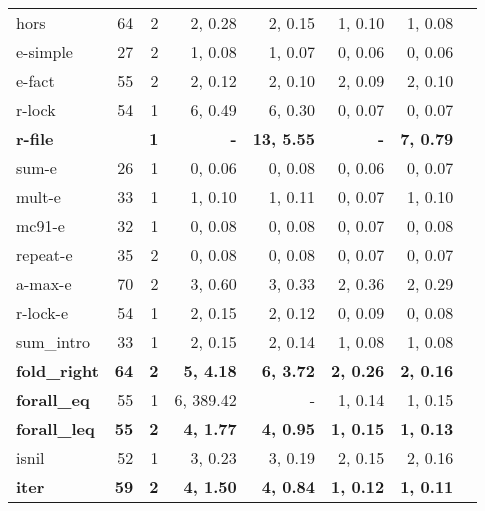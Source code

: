 \begin{table}
\begin{center}
\begin{tabular}{|l|r|r|r|r|r|r|r|}
\!hors       &    64&      2& 2, 0.28 & 2, 0.15 & 1, 0.10 & 1, 0.08 \\
\!e-simple   &    27&      2& 1, 0.08 & 1, 0.07 & 0, 0.06 & 0, 0.06 \\
\!e-fact     &    55&      2& 2, 0.12 & 2, 0.10 & 2, 0.09 & 2, 0.10 \\
\!r-lock     &    54&      1& 6, 0.49 & 6, 0.30 & 0, 0.07 & 0, 0.07 \\
\!\bf  r-file     &\bf    \!168&\bf       1&\bf  - &\bf  13, 5.55 &\bf  - &\bf  7, 0.79 \\
\!sum-e      &    26&      1& 0, 0.06 & 0, 0.08 & 0, 0.06 & 0, 0.07 \\
\!mult-e     &    33&      1& 1, 0.10 & 1, 0.11 & 0, 0.07 & 1, 0.10 \\
\!mc91-e     &    32&      1& 0, 0.08 & 0, 0.08 & 0, 0.07 & 0, 0.08 \\
\!repeat-e   &    35&      2& 0, 0.08 & 0, 0.08 & 0, 0.07 & 0, 0.07 \\
\!a-max-e    &    70&      2& 3, 0.60 & 3, 0.33 & 2, 0.36 & 2, 0.29 \\
\!r-lock-e   &    54&      1& 2, 0.15 & 2, 0.12 & 0, 0.09 & 0, 0.08 \\
\hline
\!sum\_intro        &  33 & 1 & 2, 0.15 & 2, 0.14 & 1, 0.08 & 1, 0.08 \\
\!\bf  fold\_right       &\bf   64 &\bf  2 &\bf  5, 4.18 &\bf  6, 3.72 &\bf  2, 0.26 &\bf  2, 0.16 \\
\!\bf forall\_eq  &  55 & 1 & 6, 389.42 & - & 1, 0.14 & 1, 0.15 \\
\!\bf  forall\_leq       &\bf   55 &\bf  2 &\bf  4, 1.77 &\bf  4, 0.95 &\bf  1, 0.15 &\bf  1, 0.13 \\
\!isnil             &  52 & 1 & 3, 0.23 & 3, 0.19 & 2, 0.15 & 2, 0.16 \\
\!\bf  iter              &\bf   59 &\bf  2 &\bf  4, 1.50 &\bf  4, 0.84 &\bf  1, 0.12 &\bf  1, 0.11 \\

\end{tabular}
\end{center}
\end{table}
